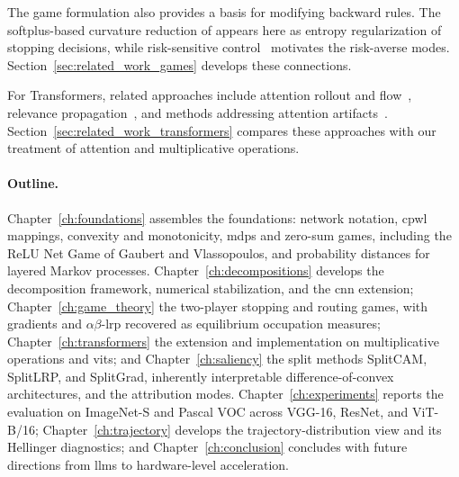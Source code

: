 The game formulation also provides a basis for modifying backward rules. The softplus-based curvature reduction of \textcite{Dombrowski2020} appears here as entropy regularization of stopping decisions, while risk-sensitive control~\parencite{zhang2021risk} motivates the risk-averse modes. Section~\ref{sec:related_work_games} develops these connections.

For Transformers, related approaches include attention rollout and flow~\parencite{Abnar2020attention}, relevance propagation~\parencite{Chefer2021ICCV,Chefer2021GenericAttention,Ali2022AttnLRP,Achtibat2024AttnLRP}, and methods addressing attention artifacts~\parencite{Wrobel2024,darcet2024vision}. Section~\ref{sec:related_work_transformers} compares these approaches with our treatment of attention and multiplicative operations.

\paragraph{Outline.}
Chapter~\ref{ch:foundations} assembles the foundations: network notation, \ac{cpwl} mappings, convexity and monotonicity, \acp{mdp} and zero-sum games, including the ReLU Net Game of Gaubert and Vlassopoulos, and probability distances for layered Markov processes. Chapter~\ref{ch:decompositions} develops the decomposition framework, numerical stabilization, and the \ac{cnn} extension; Chapter~\ref{ch:game_theory} the two-player stopping and routing games, with gradients and $\alpha\beta$-\ac{lrp} recovered as equilibrium occupation measures; Chapter~\ref{ch:transformers} the extension and implementation on multiplicative operations and \acp{vit}; and Chapter~\ref{ch:saliency} the split methods SplitCAM, SplitLRP, and SplitGrad, inherently interpretable difference-of-convex architectures, and the attribution modes. Chapter~\ref{ch:experiments} reports the evaluation on ImageNet-S and Pascal VOC across VGG-16, ResNet, and ViT-B/16; Chapter~\ref{ch:trajectory} develops the trajectory-distribution view and its Hellinger diagnostics; and Chapter~\ref{ch:conclusion} concludes with future directions from \acp{llm} to hardware-level acceleration.
